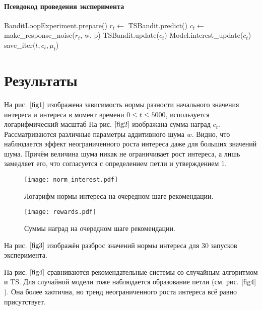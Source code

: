 \documentclass[12pt, twoside]{article}
\begin{document}
\paragraph{Псевдокод проведения эксперимента}
\begin{algorithmic}
  \STATE BanditLoopExperiment.prepare()
    \STATE $r_t \leftarrow$ TSBandit.predict()
    \STATE $c_t \leftarrow$ make\_response\_noise($r_t$, w, p)
    \STATE TSBandit.update($c_t$)
    \STATE Model.interest\_update($c_t$)
    \STATE save\_iter($t, c_t, \mu_t$)
  \ENDFOR
\end{algorithmic}

\section{Результаты}
На рис.$~\ref{fig1}$ изображена зависимость нормы разности начального значения интереса и интереса в момент времени $0 \leq t \leq 5000$, используется логарифмический масштаб 
На рис.$~\ref{fig2}$ изображана сумма наград $c_t$.
Рассматриваются различные параметры аддитивного шума $w$.
Видно, что наблюдается эффект неограниченного роста интереса даже для больших значений шума. 
Причём величина шума никак не ограничивает рост интереса, а лишь замедляет его, что согласуется с определением петли и утверждением 1. 


\begin{figure}[h]
  \begin{multicols}{2}
    \hfill
    \texttt{[image: norm\_interest.pdf]}
    \hfill
    \caption{Логарифм нормы интереса на очередном шаге рекомендации.}
    \label{fig1}
    \hfill
    \texttt{[image: rewards.pdf]}
    \hfill
    \caption{Суммы наград на очередном шаге рекомендации.}
    \label{fig2}
  \end{multicols}
\end{figure}


На рис.$~\ref{fig3}$ изображён разброс значений нормы интереса для 30 запусков эксперимента.

На рис.$~\ref{fig4}$ сравниваются рекомендательные системы со случайным алгоритмом и TS.
Для случайной модели тоже наблюдается образование петли (см. рис.$~\ref{fig4}$). 
Она более хаотична, но тренд неограниченного роста интереса всё равно присутствует.   
\end{document}

